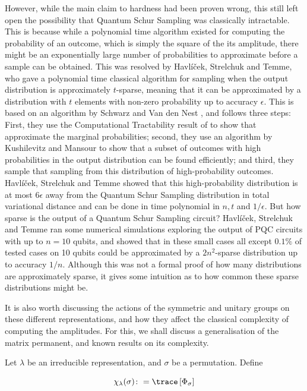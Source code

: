 However, while the main claim to hardness had been proven wrong, this still left open the possibility that Quantum Schur Sampling was classically intractable. This is because while a polynomial time algorithm existed for computing the probability of an outcome, which is simply the square of the its amplitude, there might be an exponentially large number of probabilities to approximate before a sample can be obtained. This was resolved by Havl\'{i}\v{c}ek, Strelchuk and Temme, who gave a polynomial time classical algorithm for sampling when the output distribution is approximately $t$-sparse, meaning that it can be approximated by a distribution with $t$ elements with non-zero probability up to accuracy $\epsilon$. This is based on an algorithm by Schwarz and Van den Nest \cite{schwarz2013}, and follows three steps: First, they use the Computational Tractability result of \cite{havlicek2018} to show that approximate the marginal probabilities; second, they use an algorithm by Kushilevitz and Mansour to show that a subset of outcomes with high probabilities in the output distribution can be found efficiently; and third, they sample that sampling from this distribution of high-probability outcomes. Havl\'{i}\v{c}ek, Strelchuk and Temme showed that this high-probability distribution is at most $6\epsilon$ away from the Quantum Schur Sampling distribution in total variational distance and can be done in time polynomial in $n, t$ and $1/\epsilon$. But how sparse is the output of a Quantum Schur Sampling circuit? Havl\'{i}\v{c}ek, Strelchuk and Temme ran some numerical simulations exploring the output of PQC circuits with up to $n=10$ qubits, and showed that in these small cases all except $0.1\%$ of tested cases on 10 qubits could be approximated by a $2n^2$-sparse distribution up to accuracy $1/n$. Although this was not a formal proof of how many distributions are approximately sparse, it gives some intuition as to how common these sparse distributions might be.

It is also worth discussing the actions of the symmetric and unitary groups on these different representations, and how they affect the classical complexity of computing the amplitudes. For this, we shall discuss a generalisation of the matrix permanent, and known results on its complexity.

Let $\lambda$ be an irreducible representation, and $\sigma$ be a permutation. Define

\begin{equation}
\chi_\lambda(\sigma) \colon= \trace\left[\Phi_\sigma\right]
\end{equation}

